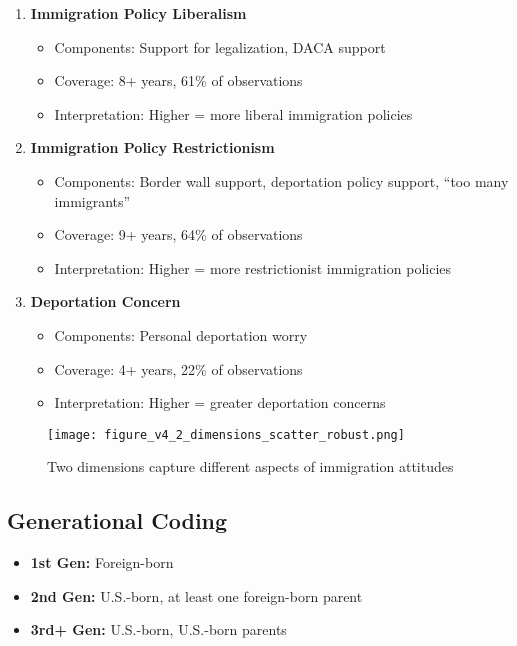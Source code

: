 \documentclass[11pt,letterpaper]{article}
\begin{document}
\begin{enumerate}
    \item \textbf{Immigration Policy Liberalism}
    \begin{itemize}
        \item Components: Support for legalization, DACA support
        \item Coverage: 8+ years, 61\% of observations
        \item Interpretation: Higher = more liberal immigration policies
    \end{itemize}
    
    \item \textbf{Immigration Policy Restrictionism}
    \begin{itemize}
        \item Components: Border wall support, deportation policy support, ``too many immigrants''
        \item Coverage: 9+ years, 64\% of observations
        \item Interpretation: Higher = more restrictionist immigration policies
    \end{itemize}
    
    \item \textbf{Deportation Concern}
    \begin{itemize}
        \item Components: Personal deportation worry
        \item Coverage: 4+ years, 22\% of observations
        \item Interpretation: Higher = greater deportation concerns
    \end{itemize}
\end{enumerate}

\begin{figure}[H]
    \centering
    \texttt{[image: figure\_v4\_2\_dimensions\_scatter\_robust.png]}
    \caption{Two dimensions capture different aspects of immigration attitudes}
    \label{fig:dimensions}
\end{figure}

\subsection{Generational Coding}
\begin{itemize}
    \item \textbf{1st Gen:} Foreign-born
    \item \textbf{2nd Gen:} U.S.-born, at least one foreign-born parent
    \item \textbf{3rd+ Gen:} U.S.-born, U.S.-born parents
\end{itemize}
\end{document}
